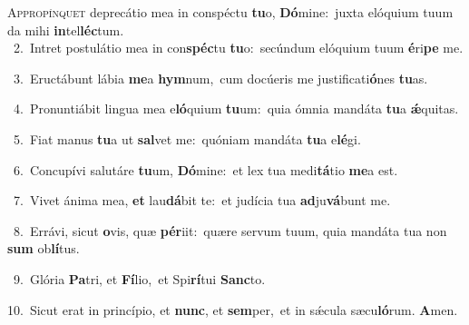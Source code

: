 \lettrine{\initial\textcolor{\initialcolor}{A}}{ppropínquet} deprecátio mea in conspéctu \textbf{tu}\-o, \textbf{Dó}\-mine:~\star juxta elóquium tuum da mihi \textbf{in}\-tel\-\textbf{léc}\-tum.\\
{\numbfont\textcolor{\numbcolor}{~2.}}~Intret postulátio mea in con\-\textbf{spéc}\-tu \textbf{tu}\-o:~\star secúndum elóquium tuum \textbf{é}\-ri\textbf{pe} me.\par
{\numbfont\textcolor{\numbcolor}{~3.}}~Eructábunt lábia \textbf{me}\-a \textbf{hym}\-num,~\star cum docúeris me justificati\-\textbf{ó}\-nes \textbf{tu}\-as.\par
{\numbfont\textcolor{\numbcolor}{~4.}}~Pronuntiábit lingua mea e\-\textbf{ló}\-quium \textbf{tu}\-um:~\star quia ómnia mandáta \textbf{tu}\-a \textbf{ǽ}\-quitas.\par
{\numbfont\textcolor{\numbcolor}{~5.}}~Fiat manus \textbf{tu}\-a ut \textbf{sal}\-vet me:~\star quóniam mandáta \textbf{tu}\-a e\-\textbf{lé}\-gi.\par
{\numbfont\textcolor{\numbcolor}{~6.}}~Concupívi salutáre \textbf{tu}\-um, \textbf{Dó}\-mine:~\star et lex tua medi\-\textbf{tá}\-tio \textbf{me}\-a est.\par
{\numbfont\textcolor{\numbcolor}{~7.}}~Vivet ánima mea, \textbf{et} lau\-\textbf{dá}\-bit te:~\star et judícia tua \textbf{ad}\-ju\-\textbf{vá}\-bunt me.\par
{\numbfont\textcolor{\numbcolor}{~8.}}~Errávi, sicut \textbf{o}\-vis, quæ \textbf{pér}\-iit:~\star quære servum tuum, quia mandáta tua non \textbf{sum} ob\-\textbf{lí}\-tus.\par
{\numbfont\textcolor{\numbcolor}{~9.}}~Glória \textbf{Pa}\-tri, et \textbf{Fí}\-lio,~\star et Spi\-\textbf{rí}\-tui \textbf{Sanc}\-to.\par
{\numbfont\textcolor{\numbcolor}{10.}}~Sicut erat in princípio, et \textbf{nunc}\-, et \textbf{sem}\-per,~\star et in sǽcula sæcu\-\textbf{ló}\-rum. \textbf{A}\-men.\par
